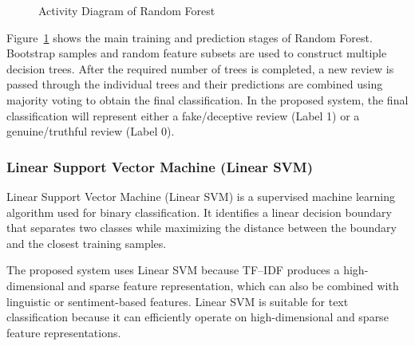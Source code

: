 \documentclass[12pt,a4paper]{report}
\begin{document}
\begin{figure}[H]

\caption{Activity Diagram of Random Forest}
\label{fig:random_forest_activity}
\end{figure}

Figure~\ref{fig:random_forest_activity} shows the main training and prediction stages of Random Forest. Bootstrap samples and random feature subsets are used to construct multiple decision trees. After the required number of trees is completed, a new review is passed through the individual trees and their predictions are combined using majority voting to obtain the final classification. In the proposed system, the final classification will represent either a fake/deceptive review (Label 1) or a genuine/truthful review (Label 0).

\subsubsection*{Linear Support Vector Machine (Linear SVM)}

Linear Support Vector Machine (Linear SVM) is a supervised machine learning algorithm used for binary classification. It identifies a linear decision boundary that separates two classes while maximizing the distance between the boundary and the closest training samples.

The proposed system uses Linear SVM because TF--IDF produces a high-dimensional and sparse feature representation, which can also be combined with linguistic or sentiment-based features. Linear SVM is suitable for text classification because it can efficiently operate on high-dimensional and sparse feature representations.
\end{document}
